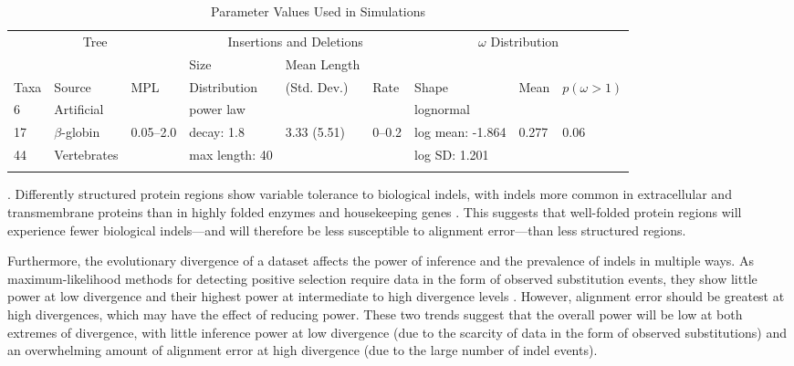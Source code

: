\documentclass{article}
\begin{document}
\begin{table}
\caption{Parameter Values Used in Simulations}
\begin{threeparttable}
\footnotesize
\begin{tabular}{lllllllll}
\toprule
 \multicolumn{3}{c}{Tree} & \multicolumn{3}{c}{Insertions and Deletions} & \multicolumn{3}{c}{$\omega$ Distribution} \\
\cmidrule(r){1-3} \cmidrule(r){4-6} \cmidrule(r){7-9}
 & & & Size & Mean Length & & & & \\
Taxa & Source & MPL & Distribution & (Std. Dev.) & Rate & Shape & Mean & $p (\omega>1)$ \\
\midrule
6 & Artificial & & power law & & & lognormal & & \\
17 & $\beta$-globin & 0.05--2.0 & decay: 1.8 & 3.33 (5.51) & 0--0.2 & log mean: -1.864 & 0.277 & 0.06 \\
44 & Vertebrates & & max length: 40 & & &  log SD: 1.201 & & \\
\bottomrule
\label{table_1}
\end{tabular}
\end{threeparttable}
\end{table}

. Differently structured protein regions show
  variable tolerance to biological indels, with indels more common in
  extracellular and transmembrane proteins than in highly folded
  enzymes and housekeeping genes \citep{delaChaux2007DNA}. This
  suggests that well-folded protein regions will experience fewer
  biological indels---and will therefore be less susceptible to
  alignment error---than less structured regions.

Furthermore, the evolutionary divergence of a dataset affects the
power of \sw inference and the prevalence of indels in multiple
ways. As maximum-likelihood methods for detecting positive selection
require data in the form of observed substitution events, they show
little power at low divergence and their highest power at intermediate
to high divergence levels \citep{Anisimova2001Accuracy}. However,
alignment error should be greatest at high divergences, which may have
the effect of reducing power. These two trends suggest that the
overall power will be low at both extremes of divergence, with little
inference power at low divergence (due to the scarcity of data in the
form of observed substitutions) and an overwhelming amount of
alignment error at high divergence (due to the large number of indel
events).
\end{document}
